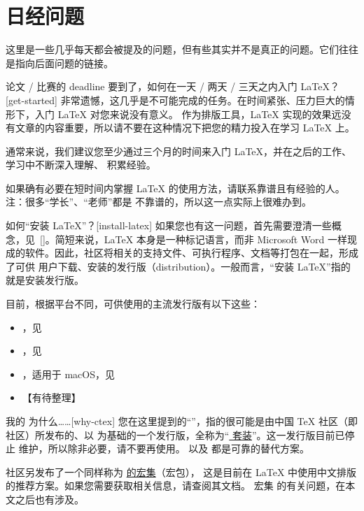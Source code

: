 \section{日经问题} \label{sec:starter}

这里是一些几乎每天都会被提及的问题，但有些其实并不是真正的问题。它们往往是指向后面问题的链接。

\begin{faq}{论文 / 比赛的 deadline 要到了，如何在一天 / 两天 / 三天之内入门 \LaTeX{}？}[get-started]
非常遗憾，这几乎是不可能完成的任务。在时间紧张、压力巨大的情形下，入门 \LaTeX{} 对您来说没有意义。
作为排版工具，\LaTeX{} 实现的效果远没有文章的内容重要，所以请不要在这种情况下把您的精力投入在学习
\LaTeX{} 上。

通常来说，我们建议您至少通过三个月的时间来入门 \LaTeX{}，并在之后的工作、学习中不断深入理解、
积累经验。

如果确有必要在短时间内掌握 \LaTeX{} 的使用方法，请联系靠谱且有经验的人。注：很多“学长”、“老师”都是
不靠谱的，所以这一点实际上很难办到。
\end{faq}

\begin{faq}{如何“安装 \LaTeX{}”？}[install-latex]
如果您也有这一问题，首先需要澄清一些概念，见~\ref{}。简短来说，\LaTeX{} 本身是一种标记语言，而非
Microsoft Word 一样现成的软件。因此，社区将相关的支持文件、可执行程序、文档等打包在一起，形成了可供
用户下载、安装的发行版（distribution）。一般而言，“安装 \LaTeX{}”指的就是安装发行版。

目前，根据平台不同，可供使用的主流发行版有以下这些：

\begin{itemize}

  \item \TeXLive{}，见~
  \item \MiKTeX{}，见~
  \item \MacTeX{}，适用于 macOS，见~
  \item 【有待整理】
\end{itemize}
\end{faq}

\begin{faq}{我的 \CTeX{} 为什么……}[why-ctex]
您在这里提到的“\CTeX{}”，指的很可能是由中国 \TeX{} 社区（即 \CTeX{} 社区）所发布的、以 \MiKTeX{}
为基础的一个发行版，全称为“\href{http://www.ctex.org/CTeX}{\CTeX{} 套装}”。这一发行版目前已停止
维护，所以除非必要，请不要再使用。\TeXLive{} 以及 \MiKTeX{} 都是可靠的替代方案。

\CTeX{} 社区另发布了一个同样称为 \href{https://www.ctan.org/pkg/ctex}{\CTeX{} 的宏集}（宏包），
这是目前在 \LaTeX{} 中使用中文排版的推荐方案。如果您需要获取相关信息，请查阅其文档。\CTeX{} 宏集
的有关问题，在本文之后也有涉及。
\end{faq}
